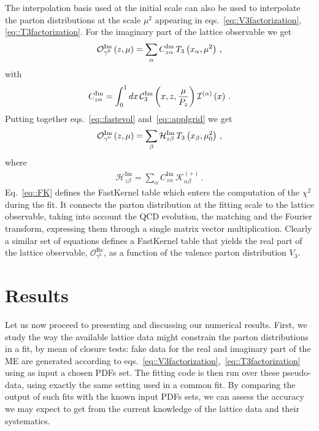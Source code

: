 The interpolation basis used at the initial scale can also be used to
interpolate the parton distributions at the scale $\mu^2$ appearing in
eqs.~\eqref{eq::V3factorization}, \eqref{eq::T3factorization}. For the imaginary part of the lattice observable we get
\begin{align}
	\label{eq::applgrid}             
	\mathcal{O}_{\gamma^0}^{\mathrm{Im}}\left( z,\mu \right) = 
	\sum_{\alpha} C_{z\alpha}^{\mathrm{Im}}\, 
	T_3\left(x_{\alpha},\mu^2\right)\, , 
\end{align}
with
\begin{align}
	C_{z\alpha}^{\mathrm{Im}} = \int_0^1 dx\, 
	\mathcal{C}_3^{\mathrm{Im}}\left( x, z, \frac{\mu}{P_z}\right) 
	\mathcal{I}^{(\alpha)}\left( x \right)\, . 
\end{align}
Putting together eqs.~\eqref{eq::fastevol} and~\eqref{eq::applgrid} we get
\begin{align}
	\mathcal{O}_{\gamma^0}^{\mathrm{Im}}\left( z,\mu \right) = 
	\sum_{\beta}
	\mathcal{H}_{z\beta}^{\mathrm{Im}}\,
	T_3\left( x_{\beta}, \mu_0^2 \right)\, , 
\end{align}
where
\begin{align}
	\label{eq::FK}
	\mathcal{H}_{z\beta}^{\mathrm{Im}} = 
	\sum_{\alpha} C_{z\alpha}^{\mathrm{Im}}\, 
	\mathcal{K}^{(+)}_{\alpha\beta}\, . 
\end{align}
Eq.~\eqref{eq::FK} defines the FastKernel table which enters the computation of
the $\chi^2$ during the fit. It connects the parton distribution at the fitting
scale to the lattice observable, taking into account the QCD evolution, the
matching and the Fourier transform, expressing them through a single matrix
vector multiplication. Clearly a similar set of equations defines a FastKernel
table that yields the real part of the lattice observable,
$\mathcal{O}_{\gamma^0}^{\mathrm{Re}}$, as a function of the valence parton
distribution $V_3$.

\section{Results}
\label{sec:results}

Let us now proceed to presenting and discussing our numerical results. First, we
study the way the available lattice data might constrain the parton
distributions in a fit, by mean of closure tests: fake data for the real and
imaginary part of the ME are generated according to
eqs.~\eqref{eq::V3factorization},~\eqref{eq::T3factorization} using as input a
chosen PDFs set. The fitting code is then run over these pseudo-data, using
exactly the same setting used in a common fit. By comparing the output of such
fits with the known input PDFs sets, we can assess the accuracy we may expect to
get from the current knowledge of the lattice data and their systematics. 

